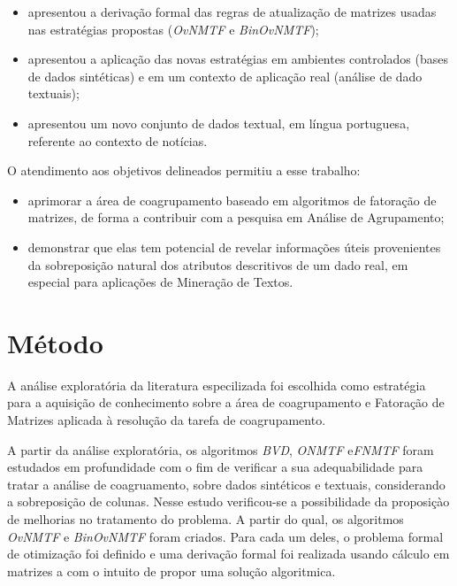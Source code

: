 \documentclass[
    12pt,                %
    oneside,            %
    a4paper,            %
    english,            %
    brazil                %
    ]{abntex2ppgsi}
\begin{document}
\begin{itemize}
\item apresentou a derivação formal das regras de atualização de matrizes usadas nas estratégias propostas (\textit{OvNMTF} e \textit{BinOvNMTF});
\item apresentou a aplicação das novas estratégias em ambientes controlados (bases de dados sintéticas) e em um contexto de aplicação real (análise de dado textuais);
\item apresentou um novo conjunto de dados textual, em língua portuguesa, referente ao contexto de notícias.
\end{itemize}

O atendimento aos objetivos delineados permitiu a esse trabalho:

\begin{itemize}
\item aprimorar a área de coagrupamento baseado em algoritmos de fatoração de matrizes, de forma a contribuir com a pesquisa em Análise de Agrupamento;
\item demonstrar que elas tem potencial de revelar informações úteis provenientes da sobreposição natural dos atributos descritivos de um dado real, em especial para aplicações de Mineração de Textos.
\end{itemize}


\section{Método}

A análise exploratória da literatura especilizada foi escolhida como estratégia para a aquisição de conhecimento sobre a área de coagrupamento e Fatoração de Matrizes aplicada à resolução da tarefa de coagrupamento.

A partir da análise exploratória, os algoritmos \textit{BVD}, \textit{ONMTF} e\textit{FNMTF} foram estudados em profundidade com o fim de verificar a sua adequabilidade para tratar a análise de coagruamento, sobre dados sintéticos e textuais, considerando a sobreposição de colunas.
Nesse estudo verificou-se a possibilidade da proposiçào de melhorias no tratamento do problema.
A partir do qual, os algoritmos \textit{OvNMTF} e \textit{BinOvNMTF} foram criados.
Para cada um deles, o problema formal de otimização foi definido e uma derivação formal foi realizada usando cálculo em matrizes a com o intuito de propor uma solução algoritmica.
\end{document}
